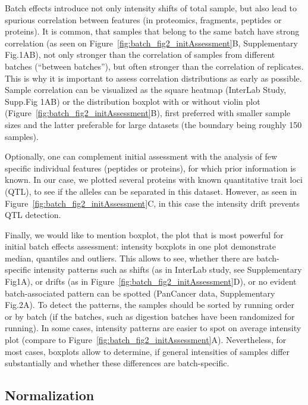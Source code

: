 \documentclass[num-refs]{wiley-article}
\begin{document}
Batch effects introduce not only intensity shifts of total sample, but also lead to spurious correlation between features (in proteomics, fragments, peptides or proteins). It is common, that samples that belong to the same batch have strong correlation (as seen on Figure~\ref{fig:batch_fig2_initAssessment}B, Supplementary Fig.1AB), not only stronger than the correlation of samples from different batches (“between batches”), but often stronger than the correlation of replicates. This is why it is important to assess correlation distributions as early as possible. Sample correlation can be visualized as the square heatmap (InterLab Study, Supp.Fig 1AB) or the distribution boxplot with or without violin plot (Figure~\ref{fig:batch_fig2_initAssessment}B), first preferred with smaller sample sizes and the latter preferable for large datasets (the boundary being roughly 150 samples).

Optionally, one can complement initial assessment with the analysis of few specific individual features (peptides or proteins), for which prior information is known. In our case, we plotted several proteins with known quantitative trait loci (QTL), to see if the alleles can be separated in this dataset. However, as seen in Figure~\ref{fig:batch_fig2_initAssessment}C, in this case the intensity drift prevents QTL detection.

Finally, we would like to mention boxplot, the plot that is most powerful for initial batch effects assessment: intensity boxplots in one plot demonstrate median, quantiles and outliers. This allows to see, whether there are batch-specific intensity patterns such as shifts (as in InterLab study, see Supplementary Fig1A), or drifts (as in Figure~\ref{fig:batch_fig2_initAssessment}D), or no evident batch-associated pattern can be spotted (PanCancer data, Supplementary Fig.2A). To detect the patterns, the samples should be sorted by running order or by batch (if the batches, such as digestion batches have been randomized for running). In some cases, intensity patterns are easier to spot on average intensity plot (compare to Figure~\ref{fig:batch_fig2_initAssessment}A). Nevertheless, for most cases, boxplots allow to determine, if general intensities of samples differ substantially and whether these differences are batch-specific.

\subsection{Normalization}
\end{document}
